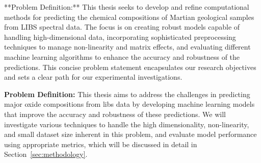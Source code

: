 **Problem Definition:** This thesis seeks to develop and refine computational methods for predicting the chemical compositions of Martian geological samples from LIBS spectral data. The focus is on creating robust models capable of handling high-dimensional data, incorporating sophisticated preprocessing techniques to manage non-linearity and matrix effects, and evaluating different machine learning algorithms to enhance the accuracy and robustness of the predictions. This concise problem statement encapsulates our research objectives and sets a clear path for our experimental investigations.

\textbf{Problem Definition:} This thesis aims to address the challenges in predicting major oxide compositions from \gls{libs} data by developing machine learning models that improve the accuracy and robustness of these predictions. 
We will investigate various techniques to handle the high dimensionality, non-linearity, and small dataset size inherent in this problem, and evaluate model performance using appropriate metrics, which will be discussed in detail in Section~\ref{sec:methodology}.
